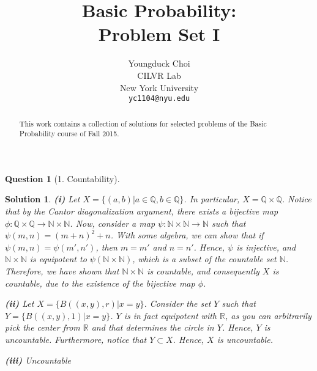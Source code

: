 \documentclass{article} %
\title{Basic Probability: \\
Problem Set I}
\author{
Youngduck Choi \\
CILVR Lab \\
New York University\\
\texttt{yc1104@nyu.edu} \\
}
\theoremstyle{quest}
\newtheorem*{question}{Question}
\newtheorem*{solution}{Solution}
\begin{document}
\maketitle

\begin{abstract}
This work contains a collection of solutions for selected problems 
of the Basic Probability course of Fall 2015.
\end{abstract}

\begin{question}[1. Countability]
\end{question}
\begin{solution}
\textbf{(i)}
Let $X = \{ (a,b) | a \in \mathbb{Q}, b \in \mathbb{Q} \}$. In particular, $X = \mathbb{Q}
\times \mathbb{Q}$. Notice that by the Cantor diagonalization argument, there exists
a bijective map $\phi: \mathbb{Q} \times \mathbb{Q} \to \mathbb{N} \times \mathbb{N}$. Now,
consider a map $\psi: \mathbb{N} \times \mathbb{N} \to \mathbb{N}$ such that $\psi(m,n) = (m+n)^2 + n$.
With some algebra, we can show that if $\psi(m,n) = \psi(m',n')$, then $m = m'$ and $n = n'$. Hence,
$\psi$ is injective, and $\mathbb{N} \times \mathbb{N}$ is equipotent to $\psi(\mathbb{N} \times \mathbb{N})$,
which is a subset of the countable set $\mathbb{N}$. Therefore, we have shown that $\mathbb{N} \times \mathbb{N}$
is countable, and consequently $X$ is countable, due to the existence of the bijective map $\phi$.

\bigskip

\textbf{(ii)}
Let $X = \{ B((x,y),r) | x = y \}$. Consider the set $Y$ such that $Y = \{ B((x,y),1) | x = y \}$. $Y$ is in fact
equipotent with $\mathbb{R}$, as you can arbitrarily pick the center from $\mathbb{R}$ and that determines the
circle in $Y$. Hence, $Y$ is uncountable. Furthermore, notice that $Y \subset X$. Hence, $X$ is uncountable.

\bigskip

\textbf{(iii)}
Uncountable


\end{solution}

\bigskip
\end{document}
